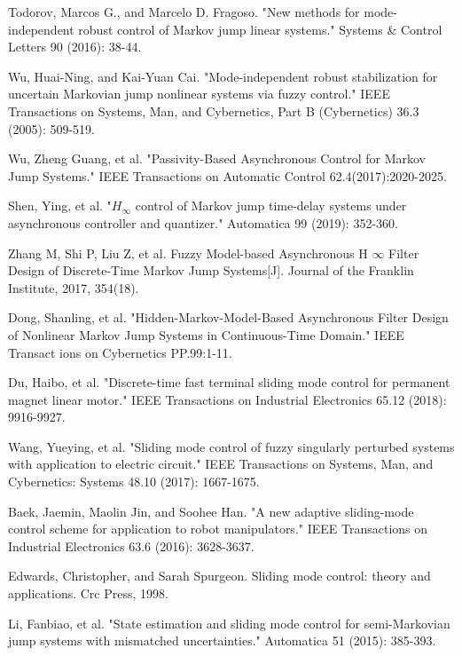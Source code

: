 \documentclass[conference]{IEEEtran}
\begin{document}
\begin{thebibliography}{1}
	
	Todorov, Marcos G., and Marcelo D. Fragoso. "New methods for mode-independent robust control of Markov jump linear systems." Systems \& Control Letters 90 (2016): 38-44.
	
	Wu, Huai-Ning, and Kai-Yuan Cai. "Mode-independent robust stabilization for uncertain Markovian jump nonlinear systems via fuzzy control." IEEE Transactions on Systems, Man, and Cybernetics, Part B (Cybernetics) 36.3 (2005): 509-519.
	
	
	Wu, Zheng Guang, et al. "Passivity-Based Asynchronous Control for Markov Jump Systems." IEEE Transactions on Automatic Control 62.4(2017):2020-2025.
	
	Shen, Ying, et al. "$H_\infty$ control of Markov jump time-delay systems under asynchronous controller and quantizer." Automatica 99 (2019): 352-360.
	
	Zhang M, Shi P, Liu Z, et al. Fuzzy Model-based Asynchronous H $\infty$ Filter Design of Discrete-Time Markov Jump Systems[J]. Journal of the Franklin Institute, 2017, 354(18).
	
	Dong, Shanling, et al. "Hidden-Markov-Model-Based Asynchronous Filter Design of Nonlinear Markov Jump Systems in Continuous-Time Domain." IEEE Transact  ions on Cybernetics PP.99:1-11.
	
	
	Du, Haibo, et al. "Discrete-time fast terminal sliding mode control for permanent magnet linear motor." IEEE Transactions on Industrial Electronics 65.12 (2018): 9916-9927.
	
	Wang, Yueying, et al. "Sliding mode control of fuzzy singularly perturbed systems with application to electric circuit." IEEE Transactions on Systems, Man, and Cybernetics: Systems 48.10 (2017): 1667-1675.
	
	Baek, Jaemin, Maolin Jin, and Soohee Han. "A new adaptive sliding-mode control scheme for application to robot manipulators." IEEE Transactions on Industrial Electronics 63.6 (2016): 3628-3637.
	
	Edwards, Christopher, and Sarah Spurgeon. Sliding mode control: theory and applications. Crc Press, 1998.
	
	Li, Fanbiao, et al. "State estimation and sliding mode control for semi-Markovian jump systems with mismatched uncertainties." Automatica 51 (2015): 385-393.
	

\end{thebibliography}
\end{document}
